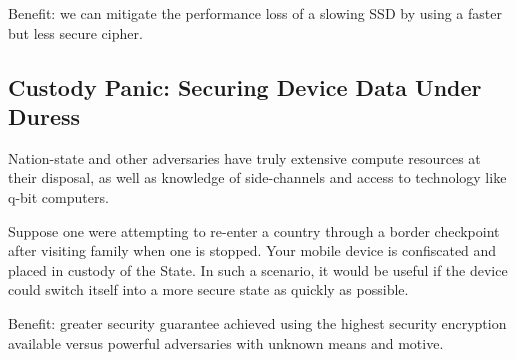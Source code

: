 Benefit: we can mitigate the performance loss of a slowing SSD by using a faster
but less secure cipher.


\subsection{Custody Panic: Securing Device Data Under Duress}

Nation-state and other adversaries have truly extensive compute resources at
their disposal, as well as knowledge of side-channels and access to technology
like q-bit computers.

Suppose one were attempting to re-enter a country through a border checkpoint
after visiting family when one is stopped. Your mobile device is confiscated and
placed in custody of the State. In such a scenario, it would be useful if the
device could switch itself into a more secure state as quickly as possible.

Benefit: greater security guarantee achieved using the highest security
encryption available versus powerful adversaries with unknown means and motive.



